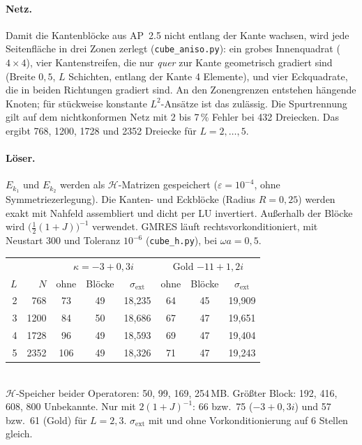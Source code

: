 \documentclass[11pt, a4paper]{article}
\begin{document}
\paragraph{Netz.} Damit die Kantenblöcke aus AP~2.5 nicht entlang der Kante wachsen, wird
jede Seitenfläche in drei Zonen zerlegt (\texttt{cube\_aniso.py}): ein grobes Innenquadrat
($4\times4$), vier Kantenstreifen, die nur \emph{quer} zur Kante geometrisch gradiert sind
(Breite $0{,}5$, $L$ Schichten, entlang der Kante 4 Elemente), und vier Eckquadrate, die in
beiden Richtungen gradiert sind. An den Zonengrenzen entstehen hängende Knoten; für
stückweise konstante $L^2$-Ansätze ist das zulässig. Die Spurtrennung gilt auf dem
nichtkonformen Netz mit 2 bis 7\,\% Fehler bei 432 Dreiecken. Das ergibt 768, 1200, 1728
und 2352 Dreiecke für $L=2,\dots,5$.

\paragraph{Löser.} $E_{k_1}$ und $E_{k_2}$ werden als $\mathcal{H}$-Matrizen gespeichert
($\varepsilon=10^{-4}$, ohne Symmetriezerlegung). Die Kanten- und Eckblöcke (Radius
$R=0{,}25$) werden exakt mit Nahfeld assembliert und dicht per LU invertiert. Außerhalb der
Blöcke wird $\big(\tfrac12(1+J)\big)^{-1}$ verwendet. GMRES läuft rechtsvorkonditioniert,
mit Neustart 300 und Toleranz $10^{-6}$ (\texttt{cube\_h.py}), bei $\omega a=0{,}5$.
\begin{center}\small
\begin{tabular}{rrcccccc}
\toprule
& & \multicolumn{3}{c}{$\kappa=-3+0{,}3i$} & \multicolumn{3}{c}{Gold $-11+1{,}2i$}\\
$L$ & $N$ & ohne & Blöcke & $\sigma_{\mathrm{ext}}$ & ohne & Blöcke & $\sigma_{\mathrm{ext}}$\\
\midrule
2 & 768 & 73 & 49 & 18,235 & 64 & 45 & 19,909\\
3 & 1200 & 84 & 50 & 18,686 & 67 & 47 & 19,651\\
4 & 1728 & 96 & 49 & 18,593 & 69 & 47 & 19,404\\
5 & 2352 & 106 & 49 & 18,326 & 71 & 47 & 19,243\\
\bottomrule
\end{tabular}\\[2pt]
{\footnotesize $\mathcal{H}$-Speicher beider Operatoren: 50, 99, 169, 254\,MB. Größter Block:
192, 416, 608, 800 Unbekannte. Nur mit $2(1+J)^{-1}$: 66 bzw.\ 75 ($-3+0{,}3i$) und 57 bzw.\ 61
(Gold) für $L=2,3$. $\sigma_{\mathrm{ext}}$ mit und ohne Vorkonditionierung auf 6 Stellen
gleich.}
\end{center}
\end{document}
